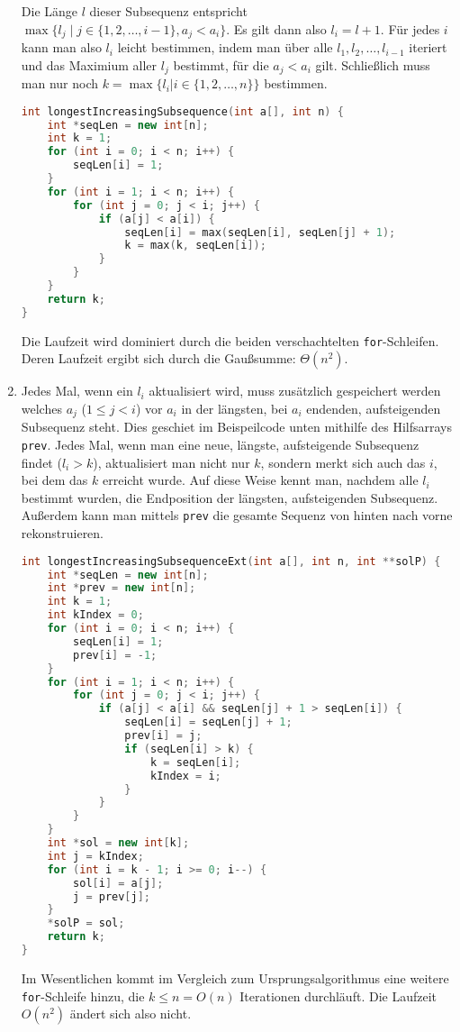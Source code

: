 \documentclass[11pt,a4paper]{article}
\begin{document}
\begin{loesung}
\begin{enumerate}
        Die Länge $l$ dieser Subsequenz entspricht $\max\{l_j \mid j \in \{1, 2, \ldots, i - 1\}, a_j < a_i\}$.
        Es gilt dann also $l_i = l + 1$.
        Für jedes $i$ kann man also $l_i$ leicht bestimmen, indem man über alle $l_1, l_2, \ldots, l_{i - 1}$ iteriert und das Maximium aller $l_j$ bestimmt, für die $a_j < a_i$ gilt.
        Schließlich muss man nur noch $k = \max\{l_i | i \in \{1, 2, \ldots, n\}\}$ bestimmen.
        \begin{lstlisting}[language=c++]
int longestIncreasingSubsequence(int a[], int n) {
    int *seqLen = new int[n];
    int k = 1;
    for (int i = 0; i < n; i++) {
        seqLen[i] = 1;
    }
    for (int i = 1; i < n; i++) {
        for (int j = 0; j < i; j++) {
            if (a[j] < a[i]) {
                seqLen[i] = max(seqLen[i], seqLen[j] + 1);
                k = max(k, seqLen[i]);
            }
        }
    }
    return k;
} 
        \end{lstlisting}
        Die Laufzeit wird dominiert durch die beiden verschachtelten \texttt{for}-Schleifen.
        Deren Laufzeit ergibt sich durch die Gaußsumme: $\Theta(n^2)$.
        \item Jedes Mal, wenn ein $l_i$ aktualisiert wird, muss zusätzlich gespeichert werden welches $a_j$ ($1 \leq j < i$) vor $a_i$ in der längsten, bei $a_i$ endenden, aufsteigenden Subsequenz steht.
        Dies geschiet im Beispeilcode unten mithilfe des Hilfsarrays \texttt{prev}.
        Jedes Mal, wenn man eine neue, längste, aufsteigende Subsequenz findet ($l_i > k$), aktualisiert man nicht nur $k$, sondern merkt sich auch das $i$, bei dem das $k$ erreicht wurde.
        Auf diese Weise kennt man, nachdem alle $l_i$ bestimmt wurden, die Endposition der längsten, aufsteigenden Subsequenz.
        Außerdem kann man mittels \texttt{prev} die gesamte Sequenz von hinten nach vorne rekonstruieren.
        \begin{lstlisting}[language=c++]
int longestIncreasingSubsequenceExt(int a[], int n, int **solP) {
    int *seqLen = new int[n];
    int *prev = new int[n];
    int k = 1;
    int kIndex = 0;
    for (int i = 0; i < n; i++) {
        seqLen[i] = 1;
        prev[i] = -1;
    }
    for (int i = 1; i < n; i++) {
        for (int j = 0; j < i; j++) {
            if (a[j] < a[i] && seqLen[j] + 1 > seqLen[i]) {
                seqLen[i] = seqLen[j] + 1;
                prev[i] = j;
                if (seqLen[i] > k) {
                    k = seqLen[i];
                    kIndex = i;
                }
            }
        }
    }
    int *sol = new int[k];
    int j = kIndex;
    for (int i = k - 1; i >= 0; i--) {
        sol[i] = a[j];
        j = prev[j];
    }
    *solP = sol;
    return k;
}
        \end{lstlisting}
        Im Wesentlichen kommt im Vergleich zum Ursprungsalgorithmus eine weitere \texttt{for}-Schleife hinzu, die $k \leq n = O(n)$ Iterationen durchläuft.
        Die Laufzeit $O(n^2)$ ändert sich also nicht.


\end{enumerate}
\end{loesung}
\end{document}
